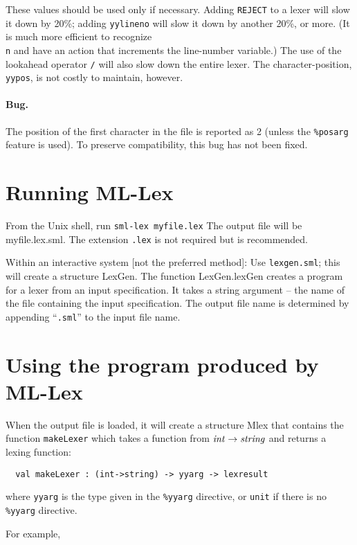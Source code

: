 These values should be used only if necessary.  Adding {\tt REJECT} to a
lexer will slow it down by 20\%; adding {\tt yylineno} will slow it down by
another 20\%, or more.  (It is much more efficient to 
recognize {\tt \\n} and
have an action that increments the line-number variable.)  The use of
the lookahead operator {\tt /} will also slow down the entire lexer.
The character-position, {\tt yypos}, is not costly to maintain, however.

\paragraph{Bug.} The position of the first character in the file
is reported as 2 (unless the {\tt \%posarg} feature is used).
To preserve compatibility, this bug has not been fixed.

\section{Running ML-Lex}

From the Unix shell, run    {\tt sml-lex~myfile.lex}
The output file will be myfile.lex.sml.  The extension {\tt .lex} is not
required but is recommended.

Within an interactive system [not the preferred method]:
Use {\tt lexgen.sml}; this will create a structure LexGen.  The function
LexGen.lexGen creates a program for a lexer from an input
specification.  It takes a string argument -- the name of the file
containing the input specification.  The output file name is
determined by appending ``{\tt .sml}'' to the input file name.

\section{Using the program produced by ML-Lex}

When the output file is loaded, it will create a structure Mlex that
contains the function {\tt makeLexer} which takes a function from
${\it int} \rightarrow {\it string}$ and returns a lexing function:

\begin{verbatim}
  val makeLexer : (int->string) -> yyarg -> lexresult
\end{verbatim}
where {\tt yyarg} is the type given in the {\tt \%yyarg} directive,
or {\tt unit} if there is no {\tt \%yyarg} directive.

For example,


